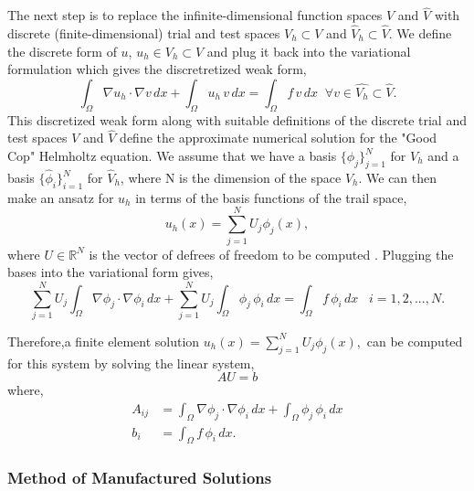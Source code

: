 \documentclass[]{article}
\theoremstyle{definition}
\begin{document}
The next step is to replace the infinite-dimensional function spaces $V$ and $\hat{V}$ with discrete (finite-dimensional) trial and test spaces $V_h \subset V$ and $\hat{V}_h \subset \hat{V}$.  We define the discrete form of $u$, $u_h \in V_h \subset V$ and plug it back into the variational formulation which gives the discretretized weak form,
\begin{equation}
\int_{\Omega} \nabla u_h \cdot \nabla v \, dx + \int_{\Omega} u_h \, v \, dx = \int_{\Omega} f \, v \, dx \;\; \forall v \in \hat{V_h} \subset \hat{V}.
\end{equation}
This discretized weak form along with suitable definitions of the discrete trial and test spaces $V$ and $\hat{V}$ define the approximate numerical solution for the "Good Cop" Helmholtz equation.  We assume that we have a basis $\lbrace \phi_j \rbrace^N_{j=1}$ for $V_h$ and a basis $\lbrace \hat{\phi}_i\rbrace^N_{i=1}$ for $\hat{V}_h$, where N is the dimension of the space $V_h$.  We can then make an ansatz for $u_h$ in terms of the basis functions of the trail space,
\begin{equation}
u_h (x) = \sum^N_{j=1} U_j \phi_j(x),
\end{equation}
where $U \in \mathbb{R}^N$ is the vector of defrees of freedom to be computed \cite{AutomatedFEM2011}.  Plugging the bases into the variational form gives,
\begin{equation}
\sum^N_{j=1} U_j \int_{\Omega} \nabla \phi_j \cdot \nabla \phi_i \, dx + \sum^N_{j=1} U_j \int_{\Omega} \phi_j \, \phi_i \, dx = \int_{\Omega} f \, \phi_i \, dx \;\;\; i = 1,2,...,N.
\end{equation}

Therefore,a finite element solution $u_h (x) = \sum^N_{j=1} U_j \phi_j(x),$ can be computed for this system by solving the linear system,
\begin{equation}
A U = b
\end{equation}
where,
\begin{align}
A_{ij} &= \int_{\Omega} \nabla \phi_j \cdot \nabla \phi_i \, dx + \int_{\Omega} \phi_j \, \phi_i \, dx \\
b_i &= \int_{\Omega} f \, \phi_i \, dx.
\end{align}

\subsubsection{Method of Manufactured Solutions}
\end{document}
